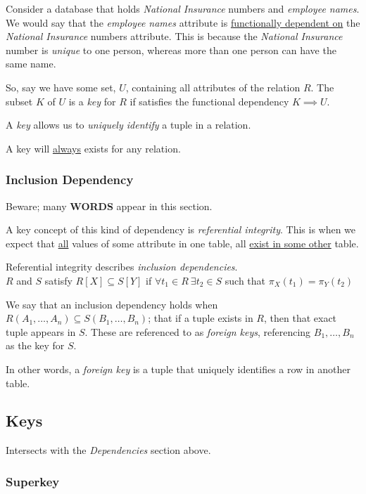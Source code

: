 \documentclass{article}
\begin{document}
Consider a database that holds \textit{National Insurance} numbers and \textit{employee names}. We would say that the \textit{employee names} attribute is \underline{functionally dependent on} the \textit{National Insurance} numbers attribute. This is because the \textit{National Insurance} number is \textit{unique} to one person, whereas more than one person can have the same name.

So, say we have some set, $U$, containing all attributes of the relation $R$. The subset $K$ of $U$ is a \textit{key} for $R$ if satisfies the functional dependency $K \implies U$.

A \textit{key} allows us to \textit{uniquely identify} a tuple in a relation.

A key will \underline{always} exists for any relation.

\subsubsection*{Inclusion Dependency}

Beware; many \textbf{WORDS} appear in this section.

A key concept of this kind of dependency is \textit{referential integrity}. This is when we expect that \underline{all} values of some attribute in one table, all \underline{exist in some other} table.

Referential integrity describes \textit{inclusion dependencies}.\\

$R$ and $S$ satisfy $R[X] \subseteq S[Y]$ if $\forall t_1 \in R \: \exists t_2\in S $ such that $\pi_X(t_1) = \pi_Y(t_2)$

We say that an inclusion dependency holds when $R(A_1, \ldots, A_n) \subseteq S(B_1, \ldots, B_n)$; that if a tuple exists in $R$, then that exact tuple appears in $S$. These are referenced to as \textit{foreign keys}, referencing $B_1, \ldots, B_n$ as the key for $S$.

In other words, a \textit{foreign key} is a tuple that uniquely identifies a row in another table.

\filbreak
\subsection{Keys}

Intersects with the \textit{Dependencies} section above.

\subsubsection*{Superkey}
\end{document}
